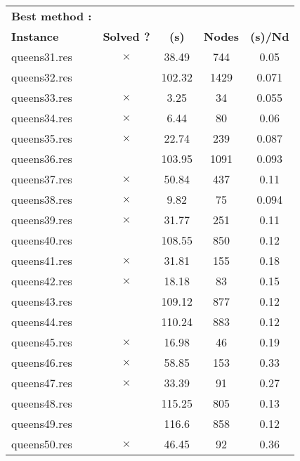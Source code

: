 \documentclass[main.tex]{subfiles}
\begin{document}
\thispagestyle{empty}

\begin{landscape}
\begin{center}
\begin{table}[h]
\centering
\caption{}
\label{}
\renewcommand{\arraystretch}{1.4} 
\begin{tabular}{|l|cccc|}
	\hline
\textbf{Best method :}\\
\textbf{Instance}  & \textbf{Solved ?} & \textbf{(s)} & \textbf{Nodes} & \textbf{(s)/Nd}\\\hline

queens31.res & $\times$ & 38.49 & 744 & 0.05
\\
queens32.res &  & 102.32 & 1429 & 0.071
\\
queens33.res & $\times$ & 3.25 & 34 & 0.055
\\
queens34.res & $\times$ & 6.44 & 80 & 0.06
\\
queens35.res & $\times$ & 22.74 & 239 & 0.087
\\
queens36.res &  & 103.95 & 1091 & 0.093
\\
queens37.res & $\times$ & 50.84 & 437 & 0.11
\\
queens38.res & $\times$ & 9.82 & 75 & 0.094
\\
queens39.res & $\times$ & 31.77 & 251 & 0.11
\\
queens40.res &  & 108.55 & 850 & 0.12
\\
queens41.res & $\times$ & 31.81 & 155 & 0.18
\\
queens42.res & $\times$ & 18.18 & 83 & 0.15
\\
queens43.res &  & 109.12 & 877 & 0.12
\\
queens44.res &  & 110.24 & 883 & 0.12
\\
queens45.res & $\times$ & 16.98 & 46 & 0.19
\\
queens46.res & $\times$ & 58.85 & 153 & 0.33
\\
queens47.res & $\times$ & 33.39 & 91 & 0.27
\\
queens48.res &  & 115.25 & 805 & 0.13
\\
queens49.res &  & 116.6 & 858 & 0.12
\\
queens50.res & $\times$ & 46.45 & 92 & 0.36
\\
\hline\end{tabular}
\end{table}
\end{center}
\end{landscape}
\end{document}
